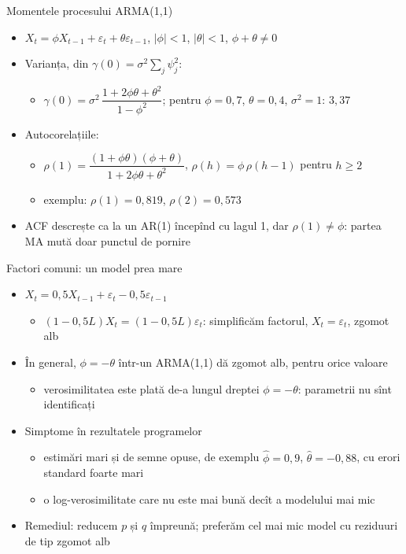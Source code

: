 \begin{frame}{Momentele procesului ARMA(1,1)}
\itemsize{\small}
\begin{itemize}
    \item $X_t = \phi X_{t-1} + \varepsilon_t + \theta\varepsilon_{t-1}$, $|\phi| < 1$, $|\theta| < 1$, $\phi + \theta \ne 0$
    \item Varianța, din $\gamma(0) = \sigma^2\sum_j\psi_j^2$:
    \begin{itemize}
        \item $\gamma(0) = \sigma^2\,\dfrac{1 + 2\phi\theta + \theta^2}{1 - \phi^2}$; pentru $\phi = 0{,}7$, $\theta = 0{,}4$, $\sigma^2 = 1$: $3{,}37$
    \end{itemize}
    \item Autocorelațiile:
    \begin{itemize}
        \item $\rho(1) = \dfrac{(1 + \phi\theta)(\phi + \theta)}{1 + 2\phi\theta + \theta^2}$, \quad $\rho(h) = \phi\,\rho(h - 1)$ pentru $h \ge 2$
        \item exemplu: $\rho(1) = 0{,}819$, $\rho(2) = 0{,}573$
    \end{itemize}
    \item ACF descrește ca la un AR(1) începînd cu lagul 1, dar $\rho(1) \ne \phi$: partea MA mută doar punctul de pornire
\end{itemize}
\end{frame}

\begin{frame}{Factori comuni: un model prea mare}
\itemsize{\small}
\begin{itemize}
    \item $X_t = 0{,}5X_{t-1} + \varepsilon_t - 0{,}5\varepsilon_{t-1}$
    \begin{itemize}
        \item $(1 - 0{,}5L)X_t = (1 - 0{,}5L)\varepsilon_t$: simplificăm factorul, $X_t = \varepsilon_t$, zgomot alb
    \end{itemize}
    \item În general, $\phi = -\theta$ într-un ARMA(1,1) dă zgomot alb, pentru orice valoare
    \begin{itemize}
        \item verosimilitatea este plată de-a lungul dreptei $\phi = -\theta$: parametrii nu sînt identificați
    \end{itemize}
    \item Simptome în rezultatele programelor
    \begin{itemize}
        \item estimări mari și de semne opuse, de exemplu $\hat\phi = 0{,}9$, $\hat\theta = -0{,}88$, cu erori standard foarte mari
        \item o log-verosimilitate care nu este mai bună decît a modelului mai mic
    \end{itemize}
    \item Remediul: reducem $p$ și $q$ împreună; preferăm cel mai mic model cu reziduuri de tip zgomot alb
\end{itemize}
\end{frame}

